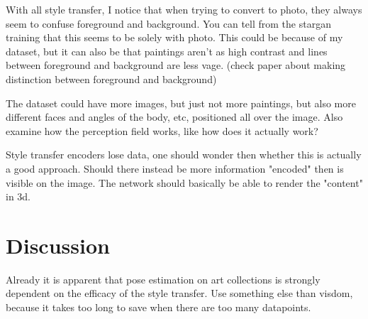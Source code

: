 With all style transfer, I notice that when trying to convert to photo, they always seem to confuse foreground and background.
You can tell from the stargan training that this seems to be solely with photo.
This could be because of my dataset, but it can also be that paintings aren't as high contrast and lines between foreground and background are less vage.
(check paper about making distinction between foreground and background)

The dataset could have more images, but just not more paintings, but also more different faces and angles of the body, etc, positioned all over the image.
Also examine how the perception field works, like how does it actually work?

Style transfer encoders lose data, one should wonder then whether this is actually a good approach.
Should there instead be more information "encoded" then is visible on the image.
The network should basically be able to render the "content" in 3d.

\section{Discussion}
\label{sec:baseline_discussion}
Already it is apparent that pose estimation on art collections is strongly dependent on the efficacy of the style transfer.
Use something else than visdom, because it takes too long to save when there are too many datapoints.

